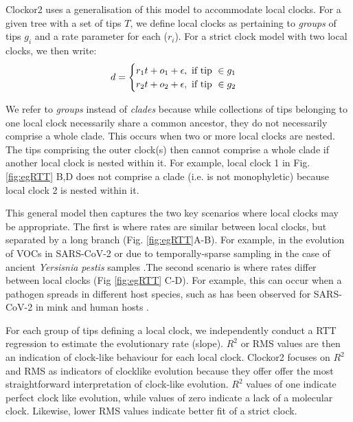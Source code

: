 \documentclass{article}
\begin{document}
Clockor2 uses a generalisation of this model to accommodate local clocks. For a given tree with a set of tips $T$, we define local clocks as pertaining to \textit{groups} of tips $g_i$ and a rate parameter for each ($r_i$). For a strict clock model with two local clocks, we then write:
\begin{equation*}
    d = 
    \begin{cases}
    r_{1}t + o_{1} + \epsilon, \textnormal{ if tip }\in g_1\\
    r_{2}t + o_{2} + \epsilon, \textnormal{ if tip }\in g_2
    
    \end{cases}
\end{equation*}

We refer to \emph{groups} instead of \emph{clades} because while collections of tips belonging to one local clock necessarily share a common ancestor, they do not necessarily comprise a whole clade. This occurs when two or more local clocks are nested. The tips comprising the outer clock(s) then cannot comprise a whole clade if another local clock is nested within it. For example, local clock 1 in Fig. \ref{fig:egRTT} B,D does not comprise a clade (i.e. is not monophyletic) because local clock 2 is nested within it.

This general model then captures the two key scenarios where local clocks may be appropriate. The first is where rates are similar between local clocks, but separated by a long branch (Fig. \ref{fig:egRTT}A-B). For example, in the evolution of VOCs in SARS-CoV-2 or due to temporally-sparse sampling in the case of ancient \textit{Yersisnia pestis} samples \citep{tay2022emergence, eaton2023plagued,hill_origins_2022}.The second scenario is where rates differ between local clocks (Fig \ref{fig:egRTT} C-D). For example, this can occur when a pathogen spreads in different host species, such as has been observed for SARS-CoV-2 in mink and human hosts \citep{porter2023evolutionary}.

For each group of tips defining a local clock, we independently conduct a RTT regression to estimate the evolutionary rate (slope). $R^2$ or RMS values are then an indication of clock-like behaviour for each local clock. Clockor2 focuses on $R^2$ and RMS as indicators of clocklike evolution because they offer offer the most straightforward interpretation of clock-like evolution. $R^2$ values of one indicate perfect clock like evolution, while values of zero indicate a lack of a molecular clock. Likewise, lower RMS values indicate better fit of a strict clock.
\end{document}

